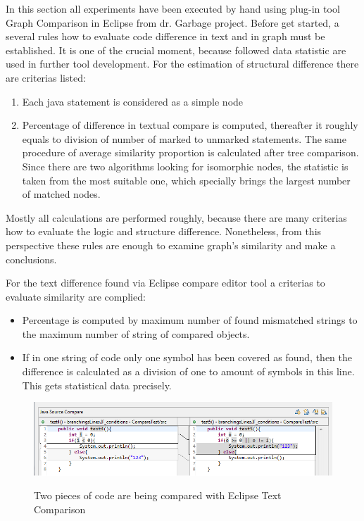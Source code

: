 \documentclass{report}
\begin{document}
In this section all experiments have been executed by hand using plug-in tool Graph Comparison in Eclipse from dr. Garbage project. Before get started, a several rules how to evaluate code difference in text and in graph must be established. It is one of the crucial moment, because followed data statistic are used in further tool development. For the estimation of structural difference there are criterias listed:
\begin{enumerate}
	\item Each java statement is considered as a simple node
	\item Percentage of difference in textual compare is computed, thereafter it roughly equals to division of number of marked to unmarked statements. The same procedure of average similarity proportion is calculated after tree comparison. Since there are two algorithms looking for isomorphic nodes, the statistic is taken from the most suitable one, which specially brings the largest number of matched nodes.
\end{enumerate}

Mostly all calculations are performed roughly, because there are many criterias how to evaluate the logic and structure difference. Nonetheless, from this perspective these rules are enough to examine graph's similarity and make a conclusions.

For the text difference found via Eclipse compare editor tool a criterias to evaluate similarity are complied:
\begin{itemize}
	\item Percentage is computed by maximum number of found mismatched strings to the maximum number of string of compared objects.
	\item If in one string of code only one symbol has been covered as found, then the difference is calculated as a division of one to amount of symbols in this line. This gets statistical data precisely.
\end{itemize}

\begin{figure}[h]
  \centering
  \includegraphics[scale = 0.5]{Figures/Java-flowchart-exp/example-graph.png}\\[0.1cm]
  \caption[Two pieces of code are being compared with Eclipse Text Comparison]{Two pieces of code are being compared with Eclipse Text Comparison}
  \label{fig:example-graph}
\end{figure}
\end{document}
